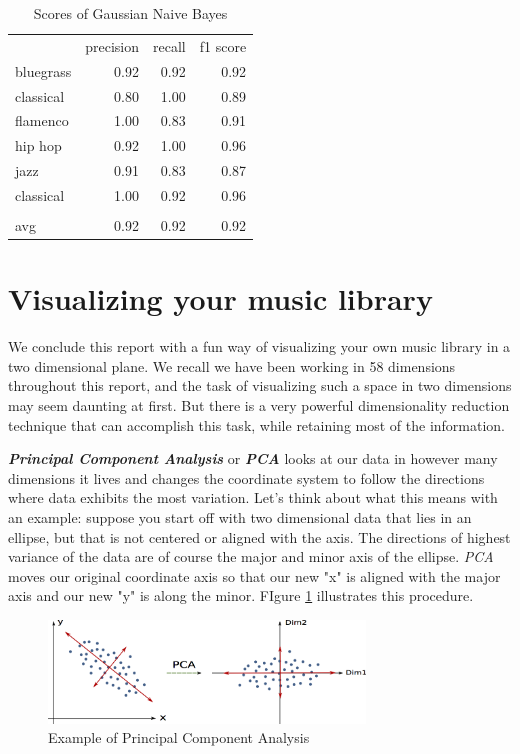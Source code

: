 \documentclass[12pt]{article}
\begin{document}
\medskip
\begin{table}[]
\centering
\begin{tabular}{lrrr}
          & precision & recall & f1 score \\
bluegrass & 0.92      & 0.92   & 0.92     \\
classical & 0.80      & 1.00   & 0.89     \\
flamenco  & 1.00      & 0.83   & 0.91     \\
hip hop   & 0.92      & 1.00   & 0.96     \\
jazz      & 0.91      & 0.83   & 0.87     \\
classical & 1.00      & 0.92   & 0.96     \\
          &           &        &          \\
avg       & 0.92      & 0.92   & 0.92    
\end{tabular}
\caption{Scores of Gaussian Naive Bayes}
\label{gaussianNB_t}
\end{table}
\medskip

\section*{Visualizing your music library}

We conclude this report with a fun way of visualizing your own music library in a two dimensional plane. We recall we have been working in 58 dimensions throughout this report, and the task of visualizing such a space in two dimensions may seem daunting at first. But there is a very powerful dimensionality reduction technique that can accomplish this task, while retaining most of the information.
\medskip

\newpage
\textit{\textbf{Principal Component Analysis}} or \textbf{\textit{PCA}} looks at our data in however many dimensions it lives and changes the coordinate system to follow the directions where data exhibits the most variation. Let's think about what this means with an example: suppose you start off with two dimensional data that lies in an ellipse, but that is not centered or aligned with the axis. The directions of highest variance of the data are of course the major and minor axis of the ellipse. \textit{PCA} moves our original coordinate axis so that our new "x" is aligned with the major axis and our new "y" is along the minor. FIgure \ref{pca_ex} illustrates this procedure.
\medskip

\begin{figure}[ht]
\centering
  \includegraphics[width=0.75\textwidth]{pca_ex.png}
  \caption{Example of Principal Component Analysis}
  \label{pca_ex}
\end{figure}
\medskip
\end{document}

